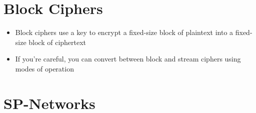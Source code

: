 \documentclass{article}
\begin{document}
\tableofcontents

\newpage

\section{Block Ciphers}
\begin{itemize}
  \item Block ciphers use a key to encrypt a fixed-size block of plaintext into a fixed-size block of ciphertext 
  \item If you’re careful, you can convert between block and stream ciphers using modes of operation
\end{itemize}

\section{SP-Networks}
\end{document}
